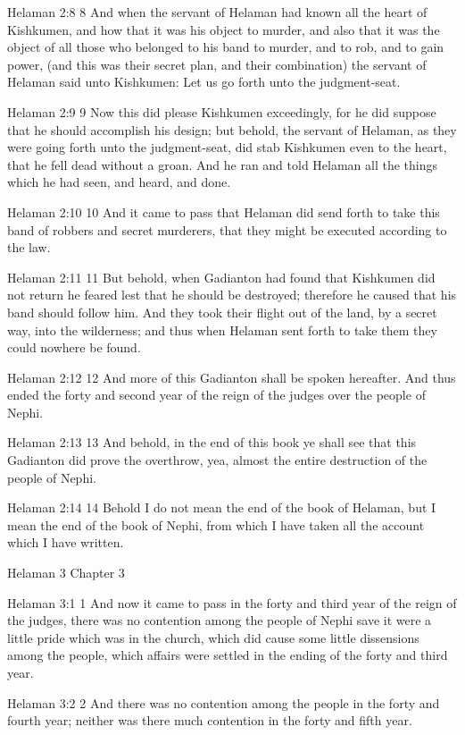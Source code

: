 Helaman 2:8
 8 And when the servant of Helaman had known all the heart of
Kishkumen, and how that it was his object to murder, and also
that it was the object of all those who belonged to his band to
murder, and to rob, and to gain power, (and this was their secret
plan, and their combination) the servant of Helaman said unto
Kishkumen: Let us go forth unto the judgment-seat.

Helaman 2:9
 9 Now this did please Kishkumen exceedingly, for he did suppose
that he should accomplish his design; but behold, the servant of
Helaman, as they were going forth unto the judgment-seat, did
stab Kishkumen even to the heart, that he fell dead without a
groan. And he ran and told Helaman all the things which he had
seen, and heard, and done.

Helaman 2:10
 10 And it came to pass that Helaman did send forth to take this
band of robbers and secret murderers, that they might be executed
according to the law.

Helaman 2:11
 11 But behold, when Gadianton had found that Kishkumen did not
return he feared lest that he should be destroyed; therefore he
caused that his band should follow him. And they took their
flight out of the land, by a secret way, into the wilderness; and
thus when Helaman sent forth to take them they could nowhere be
found.

Helaman 2:12
 12 And more of this Gadianton shall be spoken hereafter. And
thus ended the forty and second year of the reign of the judges
over the people of Nephi.

Helaman 2:13
 13 And behold, in the end of this book ye shall see that this
Gadianton did prove the overthrow, yea, almost the entire
destruction of the people of Nephi.

Helaman 2:14
 14 Behold I do not mean the end of the book of Helaman, but I
mean the end of the book of Nephi, from which I have taken all
the account which I have written.

Helaman 3
Chapter 3

Helaman 3:1
 1 And now it came to pass in the forty and third year of the
reign of the judges, there was no contention among the people of
Nephi save it were a little pride which was in the church, which
did cause some little dissensions among the people, which affairs
were settled in the ending of the forty and third year.

Helaman 3:2
 2 And there was no contention among the people in the forty and
fourth year; neither was there much contention in the forty and
fifth year.

